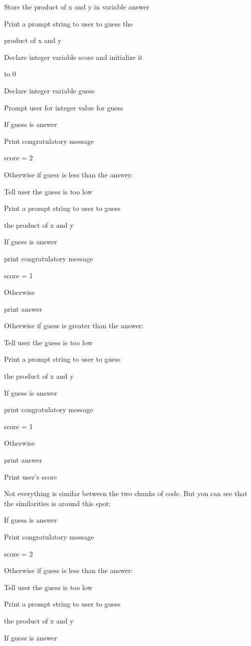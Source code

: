 \documentclass[
]{article}
\begin{document}
Store the product of x and y in variable answer

Print a prompt string to user to guess the

product of x and y

Declare integer variable score and initialize it

to 0

Declare integer variable guess

Prompt user for integer value for guess

If guess is answer

Print congratulatory message

score = 2

Otherwise if guess is less than the answer:

Tell user the guess is too low

Print a prompt string to user to guess

the product of x and y

If guess is answer

print congratulatory message

score = 1

Otherwise

print answer

Otherwise if guess is greater than the answer:

Tell user the guess is too low

Print a prompt string to user to guess

the product of x and y

If guess is answer

print congratulatory message

score = 1

Otherwise

print answer

Print user's score

Not everything is similar between the two chunks of code. But you can
see that the similarities is around this spot:

If guess is answer

Print congratulatory message

score = 2

Otherwise if guess is less than the answer:

Tell user the guess is too low

Print a prompt string to user to guess

the product of x and y

If guess is answer
\end{document}
